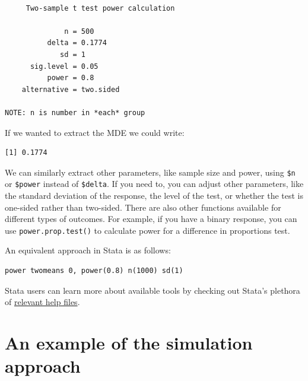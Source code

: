 \documentclass[
  12pt,
]{book}
\newenvironment{Shaded}{\begin{snugshade}}{\end{snugshade}}
\newcommand{\CommentTok}[1]{\textcolor[rgb]{0.56,0.35,0.01}{\textit{#1}}}
\newcommand{\DataTypeTok}[1]{\textcolor[rgb]{0.13,0.29,0.53}{#1}}
\newcommand{\DecValTok}[1]{\textcolor[rgb]{0.00,0.00,0.81}{#1}}
\newcommand{\FloatTok}[1]{\textcolor[rgb]{0.00,0.00,0.81}{#1}}
\newcommand{\KeywordTok}[1]{\textcolor[rgb]{0.13,0.29,0.53}{\textbf{#1}}}
\newcommand{\NormalTok}[1]{#1}
\newcommand{\OperatorTok}[1]{\textcolor[rgb]{0.81,0.36,0.00}{\textbf{#1}}}
\theoremstyle{definition}
\theoremstyle{definition}
\theoremstyle{definition}
\theoremstyle{remark}
\begin{document}
\begin{verbatim}

     Two-sample t test power calculation 

              n = 500
          delta = 0.1774
             sd = 1
      sig.level = 0.05
          power = 0.8
    alternative = two.sided

NOTE: n is number in *each* group
\end{verbatim}

If we wanted to extract the MDE we could write:

\begin{Shaded}
\end{Shaded}

\begin{verbatim}
[1] 0.1774
\end{verbatim}

We can similarly extract other parameters, like sample size and power,
using \texttt{\$n} or \texttt{\$power} instead of \texttt{\$delta}. If
you need to, you can adjust other parameters, like the standard
deviation of the response, the level of the test, or whether the test is
one-sided rather than two-sided. There are also other functions
available for different types of outcomes. For example, if you have a
binary response, you can use \texttt{power.prop.test()} to calculate
power for a difference in proportions test.

An equivalent approach in Stata is as follows:

\begin{verbatim}
power twomeans 0, power(0.8) n(1000) sd(1)
\end{verbatim}

Stata users can learn more about available tools by checking out Stata's
plethora of
\href{https://www.stata.com/features/power-and-sample-size/}{relevant
help files}.

\hypertarget{an-example-of-the-simulation-approach}{%
\section{An example of the simulation
approach}\label{an-example-of-the-simulation-approach}}
\end{document}
